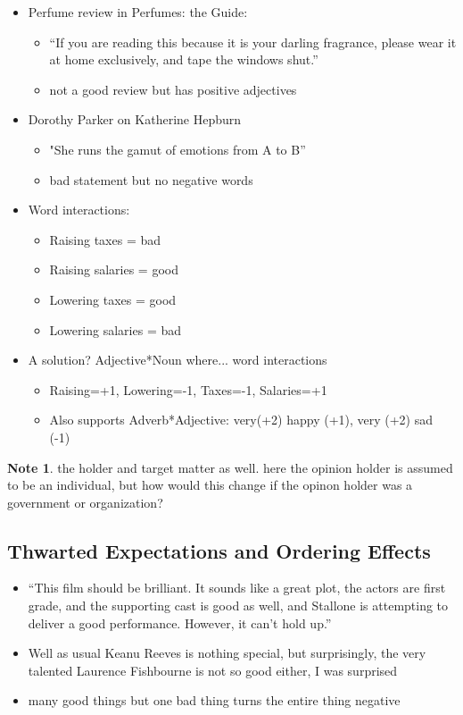\documentclass[11pt]{article}
\theoremstyle{definition}
\newtheorem{note}{Note}
\begin{document}
\begin{itemize}
  \item Perfume review in Perfumes: the Guide:
  \begin{itemize}
    \item “If you are reading this because it is your darling fragrance,
    please wear it at home exclusively, and tape the windows
    shut.”
    \item not a good review but has positive adjectives
  \end{itemize}
  \item Dorothy Parker on Katherine Hepburn
  \begin{itemize}
    \item "She runs the gamut of emotions from A to B”
    \item bad statement but no negative words
  \end{itemize}
\end{itemize}

\begin{itemize}
  \item Word interactions:
  \begin{itemize}
    \item Raising taxes = bad
    \item Raising salaries = good
    \item Lowering taxes = good
    \item Lowering salaries = bad
  \end{itemize}
  \item A solution? Adjective*Noun where... word interactions
  \begin{itemize}
    \item Raising=+1, Lowering=-1, Taxes=-1, Salaries=+1
    \item Also supports Adverb*Adjective: very(+2) happy (+1), very (+2) sad (-1)
  \end{itemize}
\end{itemize}

\begin{note}
  the holder and target matter as well. here the opinion holder is assumed to be an individual, but how would this change if the opinon holder was a government or organization?
\end{note}

\subsection{Thwarted Expectations
and Ordering Effects}
\begin{itemize}
  \item “This film should be brilliant. It sounds like a great plot, the actors are first
  grade, and the supporting cast is good as well, and Stallone is attempting to
  deliver a good performance. However, it can’t hold up.”
  \item Well as usual Keanu Reeves is nothing special, but surprisingly, the very
  talented Laurence Fishbourne is not so good either, I was surprised
  \item many good things but one bad thing turns the entire thing negative
\end{itemize}
\end{document}
